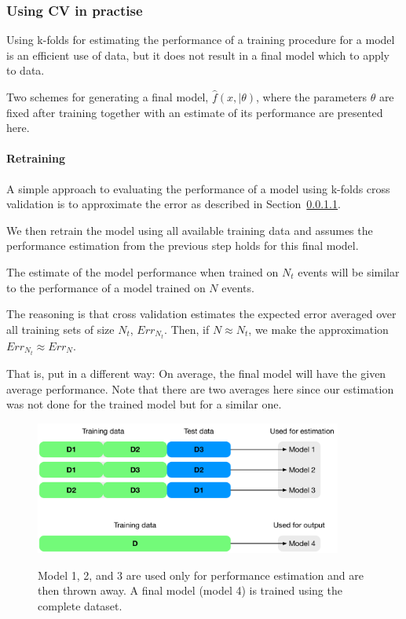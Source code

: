 \subsubsection{Using CV in practise}
\label{sec:cv-performace-estimation-methods}

Using k-folds for estimating the performance of a training procedure for a model is an efficient use of data, but it does not result in a final model which to apply to data.

Two schemes for generating a final model, $\hat{f}(x, | \theta)$, where the parameters $\theta$ are fixed after training together with an estimate of its performance are presented here.

\paragraph{Retraining}
A simple approach to evaluating the performance of a model using k-folds cross validation is to approximate the error as described in Section~\ref{}.

We then retrain the model using all available training data and assumes the performance estimation from the previous step holds for this final model.

The estimate of the model performance when trained on $N_t$ events will be similar to the performance of a model trained on $N$ events.

The reasoning is that cross validation estimates the expected error averaged over all training sets of size $N_t$, $Err_{N_t}$. Then, if $N \approx N_t$, we make the approximation $Err_{N_t} \approx Err_{N}$.

That is, put in a different way: On average, the final model will have the given average performance. Note that there are two averages here since our estimation was not done for the trained model but for a similar one.

\begin{figure}
\begin{center}
   \includegraphics[width=0.9\textwidth]{plots/cv/cv-workflows-retrain}
   \label{fig:workflow0}
   \caption{Model 1, 2, and 3 are used only for performance estimation and are then thrown away. A final model (model 4) is trained using the complete dataset.}
\end{center}
\end{figure}

